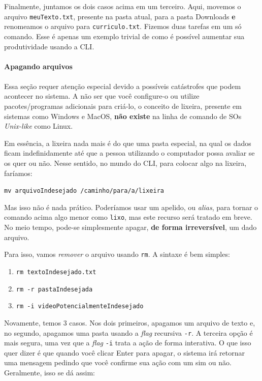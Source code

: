 \documentclass{article}
\begin{document}
	Finalmente, juntamos os dois casos acima em um terceiro. Aqui, movemos o arquivo \texttt{meuTexto.txt}, presente na pasta
	atual, para a pasta Downloads \textbf{e} renomeamos o arquivo para \texttt{curriculo.txt}. Fizemos duas tarefas em um 
	só comando. Esse é apenas um exemplo trivial de como é possível aumentar sua produtividade usando a CLI. 
	
	\paragraph{Apagando arquivos} 
	\paragraph{} 

	Essa seção requer atenção especial devido a possíveis catástrofes que podem acontecer no sistema. A não ser que você 
	configure-o ou utilize pacotes/programas adicionais para criá-lo, o conceito de lixeira, presente em sistemas
	como Windows e MacOS, \textbf{não existe} na linha de comando de SOs \textit{Unix-like} como Linux. 


	Em essência, a lixeira nada mais é do que uma pasta especial, na qual os dados ficam indefinidamente até que a pessoa
	utilizando o computador possa avaliar se os quer ou não. Nesse sentido, no mundo do CLI, para colocar algo na lixeira,
	faríamos: 
	
	\vspace{1ex} 
	\texttt{mv arquivoIndesejado /caminho/para/a/lixeira} 
	\vspace{1ex} 

	Mas isso não é nada prático. Poderíamos usar um apelido, ou \textit{alias}, para tornar o comando acima algo menor 
	como \texttt{lixo}, mas este recurso será tratado em breve. No meio tempo, pode-se simplesmente apagar,
	\textbf{de forma irreversível}, um dado arquivo. 

	Para isso, vamos \textit{remover} o arquivo usando \texttt{rm}. A sintaxe é bem simples: 
	\begin{enumerate} 
		\item{\texttt{rm textoIndesejado.txt}} 
		\item{\texttt{rm -r pastaIndesejada}} 
		\item{\texttt{rm -i videoPotencialmenteIndesejado}} 
	\end{enumerate}

	Novamente, temos 3 casos. Nos dois primeiros, apagamos um arquivo de texto e, no segundo, apagamos uma pasta usando 
	a \textit{flag} recursiva \texttt{-r}. A terceira opção é mais segura, uma vez que a \textit{flag} \texttt{-i} trata a ação de forma
	interativa. O que isso quer dizer é que quando você clicar Enter para apagar, o sistema irá retornar uma mensagem 
	pedindo que você confirme sua ação com um sim ou não. Geralmente, isso se dá assim:
	
\end{document}
